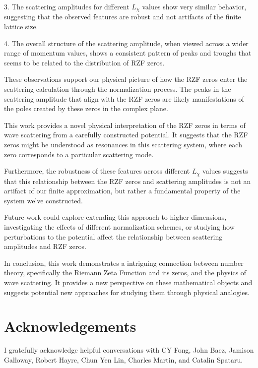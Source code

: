 \documentclass[11pt, oneside]{article}
\begin{document}
3. The scattering amplitudes for different $L_\chi$ values show very similar behavior, suggesting that the observed features are robust and not artifacts of the finite lattice size.

4. The overall structure of the scattering amplitude, when viewed across a wider range of momentum values, shows a consistent pattern of peaks and troughs that seems to be related to the distribution of RZF zeros.

These observations support our physical picture of how the RZF zeros enter the scattering calculation through the normalization process. The peaks in the scattering amplitude that align with the RZF zeros are likely manifestations of the poles created by these zeros in the complex plane.

This work provides a novel physical interpretation of the RZF zeros in terms of wave scattering from a carefully constructed potential. It suggests that the RZF zeros might be understood as resonances in this scattering system, where each zero corresponds to a particular scattering mode.

Furthermore, the robustness of these features across different $L_\chi$ values suggests that this relationship between the RZF zeros and scattering amplitudes is not an artifact of our finite approximation, but rather a fundamental property of the system we've constructed.

Future work could explore extending this approach to higher dimensions, investigating the effects of different normalization schemes, or studying how perturbations to the potential affect the relationship between scattering amplitudes and RZF zeros.

In conclusion, this work demonstrates a intriguing connection between number theory, specifically the Riemann Zeta Function and its zeros, and the physics of wave scattering. It provides a new perspective on these mathematical objects and suggests potential new approaches for studying them through physical analogies.

\section{Acknowledgements}
I gratefully acknowledge helpful conversations with CY Fong, John Baez, Jamison Galloway, Robert Hayre, Chun Yen Lin, Charles Martin, and Catalin Spataru.

\printbibliography
\end{document}
